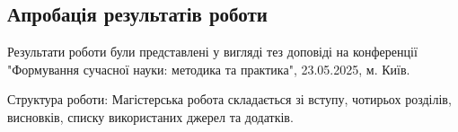 \subsection*{Апробація результатів роботи}
Результати роботи були представлені у вигляді тез доповіді на конференції "Формування сучасної науки: методика та практика", 23.05.2025, м. Київ.

Структура роботи: Магістерська робота складається зі вступу, чотирьох розділів, висновків, списку використаних джерел та додатків. 